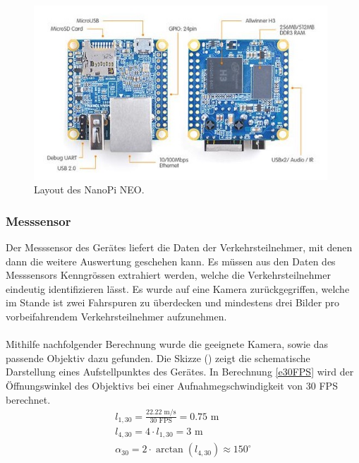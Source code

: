 \begin{figure}[H]
  \centering
  \includegraphics[width=0.98\textwidth]{Hardware/NanoPi_Neo.jpg} 
  \caption{Layout des NanoPi NEO. \cite{NanoPiNeo}}
  \label{bLayout}
\end{figure}

\subsubsection{Messsensor}
Der Messsensor des Gerätes liefert die Daten der Verkehrsteilnehmer, mit denen dann die weitere Auswertung geschehen kann. Es müssen aus den Daten des Messsensors Kenngrössen extrahiert werden, welche die Verkehrsteilnehmer eindeutig identifizieren lässt. Es wurde auf eine Kamera zurückgegriffen, welche im Stande ist zwei Fahrspuren zu überdecken und mindestens drei Bilder pro vorbeifahrendem Verkehrsteilnehmer aufzunehmen. \\\\
Mithilfe nachfolgender Berechnung wurde die geeignete Kamera, sowie das passende Objektiv dazu gefunden. Die Skizze () zeigt die schematische Darstellung eines Aufstellpunktes des Gerätes. In Berechnung \eqref{e30FPS} wird der Öffnungswinkel des Objektivs bei einer Aufnahmegschwindigkeit von 30 FPS berechnet.  
\begin{equation}
\begin{split}
l_{ 1,30 } = \frac{ 22.22\text{ m/s} }{ 30 \text{ FPS}} = 0.75 \text{ m} \\
l_{ 4,30 } = 4 \cdot l_{1,30} = 3 \text{ m}\\ 
\alpha_{30} = 2 \cdot \arctan(l_{4,30 }) \approx 150^\circ \\
\label{e30FPS}
\end{split}
\end{equation}

